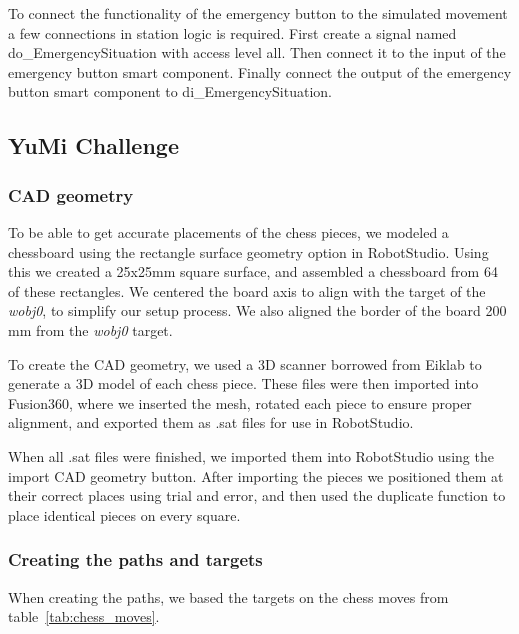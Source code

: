 \documentclass[a4paper,12pt]{article}
\begin{document}
To connect the functionality of the emergency button to the simulated movement a few connections in station logic is required. First create a signal named do\_EmergencySituation with access level all. Then connect it to the input of the emergency button smart component. Finally connect the output of the emergency button smart component to di\_EmergencySituation.

\subsection{YuMi Challenge}
\subsubsection{CAD geometry}
To be able to get accurate placements of the chess pieces, we modeled a chessboard using the rectangle surface geometry option in RobotStudio. Using this we created a 25x25mm square surface, and assembled a chessboard from 64 of these rectangles. We centered the board axis to align with the target of the \textit{wobj0}, to simplify our setup process. We also aligned the border of the board 200 mm from the \textit{wobj0} target.

To create the CAD geometry, we used a 3D scanner borrowed from Eiklab to generate a 3D model of each chess piece. These files were then imported into Fusion360, where we inserted the mesh, rotated each piece to ensure proper alignment, and exported them as .sat files for use in RobotStudio.

When all .sat files were finished, we imported them into RobotStudio using the import CAD geometry button. After importing the pieces we positioned them at their correct places using trial and error, and then used the duplicate function to place identical pieces on every square.

\subsubsection{Creating the paths and targets}
\label{sec:Challenge_paths_targets}
When creating the paths, we based the targets on the chess moves from table~\ref{tab:chess_moves}.
\end{document}
